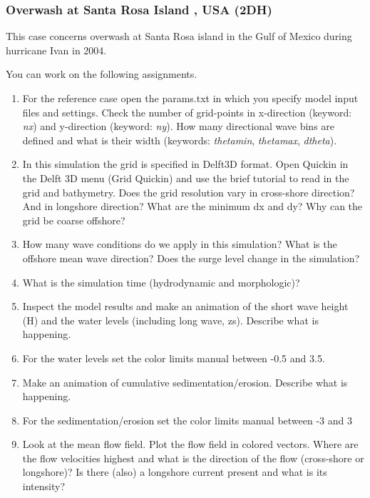 \documentclass{article}
\begin{document}
\subsubsection{ Overwash at Santa Rosa Island , USA (2DH) }

\noindent This case concerns overwash at Santa Rosa island in the Gulf of Mexico during hurricane Ivan in 2004. 

\noindent 

\noindent You can work on the following assignments.

\noindent \textbf{}

\begin{enumerate}
\item \textbf{ }For the reference case open the params.txt in which you specify model input files and settings. Check the number of grid-points in x-direction (keyword: \textit{nx}) and y-direction (keyword: \textit{ny}). How many directional wave bins are defined and what is their width (keywords: \textit{thetamin}, \textit{thetamax}, \textit{dtheta}).

\item  In this simulation the grid is specified in Delft3D format. Open Quickin in the Delft 3D menu (Grid  Quickin) and use the brief tutorial to read in the grid and bathymetry. Does the grid resolution vary in cross-shore direction? And in longshore direction? What are the minimum dx and dy? Why can the grid be coarse offshore?

\item  How many wave conditions do we apply in this simulation? What is the offshore mean wave direction? Does the surge level change in the simulation?

\item  What is the simulation time (hydrodynamic and morphologic)?

\item  Inspect the model results and make an animation of the short wave height (H) and the water levels (including long wave, zs). Describe what is happening.

\item  For the water levels set the color limits manual between -0.5 and 3.5.

\item  Make an animation of cumulative sedimentation/erosion. Describe what is happening.

\item  For the sedimentation/erosion set the color limits manual between -3 and 3

\item  Look at the mean flow field. Plot the flow field in colored vectors. Where are the flow velocities highest and what is the direction of the flow (cross-shore or longshore)? Is there (also) a longshore current present and what is its intensity?
\end{enumerate}
\end{document}
